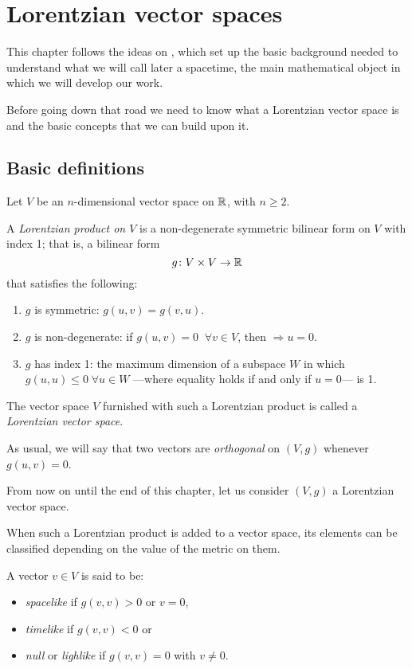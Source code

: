 \chapter{Lorentzian vector spaces}

This chapter follows the ideas on \cite{romero10}, which set up the basic background needed to understand what we will call later a spacetime, the main mathematical object in which we will develop our work.

Before going down that road we need to know what a Lorentzian vector space is and the basic concepts that we can build upon it.

\section{Basic definitions}

\begin{definition}
	Let $V$ be an $n$-dimensional vector space on $\mathbb{R}$, with $n \geq 2$.
	
	A \emph{Lorentzian product on $V$} is a non-degenerate symmetric bilinear form on $V$ with index 1; that is, a bilinear form
	\[
		g \colon V \times V \to \mathbb{R}
	\]
	that satisfies the following:
	\begin{enumerate}
		\item $g$ is symmetric: $g(u, v) = g(v, u)$.
		\item $g$ is non-degenerate: if $g(u, v) = 0 \;\; \forall v \in V$, then $\Rightarrow u = 0$.
		\item $g$ has index 1: the maximum dimension of a subspace $W$ in which $g(u,u) \leq 0 \; \forall u \in W$ ---where equality holds if and only if $u = 0$--- is 1.
	\end{enumerate}

	The vector space $V$ furnished with such a Lorentzian product is called a \emph{Lorentzian vector space}.
\end{definition}

As usual, we will say that two vectors are \emph{orthogonal} on $(V,g)$ whenever $g(u,v) = 0$.

From now on until the end of this chapter, let us consider $(V,g)$ a Lorentzian vector space.

When such a Lorentzian product is added to a vector space, its elements can be classified depending on the value of the metric on them.

\begin{definition}
	A vector $v \in V$ is said to be:
	\begin{itemize}
		\item \emph{spacelike} if $g(v,v) > 0$ or $v = 0$,
		\item \emph{timelike} if $g(v,v) < 0$ or
		\item \emph{null} or \emph{lighlike} if $g(v,v) = 0$ with $v \neq 0$.
	\end{itemize}
\end{definition}

